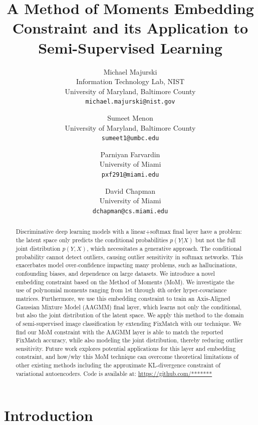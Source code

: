 \documentclass[10pt,twocolumn,letterpaper]{article}
\title{A Method of Moments Embedding Constraint and its Application to Semi-Supervised Learning}
\author{Michael Majurski\\
	Information Technology Lab, NIST\\
	University of Maryland, Baltimore County\\
	{\tt\small michael.majurski@nist.gov}
\and
Sumeet Menon\\
University of Maryland, Baltimore County\\
{\tt\small sumeet1@umbc.edu}
\and
Parniyan Farvardin\\
University of Miami\\
{\tt\small pxf291@miami.edu}
\and
David Chapman\\
University of Miami\\
{\tt\small dchapman@cs.miami.edu}
}
\begin{document}
\maketitle


\begin{abstract}
	Discriminative deep learning models with a linear+softmax final layer have a problem: the latent space only predicts the conditional probabilities $p(Y|X)$ but not the full joint distribution $p(Y,X)$, which necessitates a generative approach.
	The conditional probability cannot detect outliers, causing outlier sensitivity in softmax networks.
	This exacerbates model over-confidence impacting many problems, such as hallucinations, confounding biases, and dependence on large datasets.
	We introduce a novel embedding constraint based on the Method of Moments (MoM).
	We investigate the use of polynomial moments ranging from 1st through 4th order hyper-covariance matrices.
	Furthermore, we use this embedding constraint to train an Axis-Aligned Gaussian Mixture Model (AAGMM) final layer, which learns not only the conditional, but also the joint distribution of the latent space.
	We apply this method to the domain of semi-supervised image classification by extending FixMatch with our technique.
	We find our MoM constraint with the AAGMM layer is able to match the reported FixMatch accuracy, while also modeling the joint distribution, thereby reducing outlier sensitivity.
	Future work explores potential applications for this layer and embedding constraint, and how/why this MoM technique can overcome theoretical limitations of other existing methods including the approximate KL-divergence constraint of variational autoencoders.
	Code is available at: \url{https://github.com/*******} %
\end{abstract}


\section{Introduction}
\end{document}
